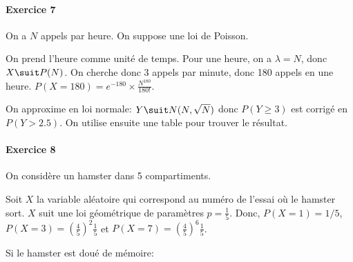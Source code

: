\documentclass[10pt,a4paper,french]{article}
\begin{document}
\paragraph{Exercice 7}
On a $N$ appels par heure. On suppose une loi de Poisson.

On prend l'heure comme unité de temps. Pour une heure, on a $\lambda = N$, donc $X \suit P(N)$. On cherche donc 3 appels par minute, donc 180 appels en une heure. $P(X=180)=e^{-180} \times \frac{N^{180}}{180!}$.

On approxime en loi normale: $Y \suit N(N, \sqrt{N})$ donc $P(Y \geq 3)$ est corrigé en $P(Y > 2.5)$. On utilise ensuite une table pour trouver le résultat.

\paragraph{Exercice 8}
On considère un hamster dans 5 compartiments.

Soit $X$ la variable aléatoire qui correspond au numéro de l'essai où le hamster sort. $X$ suit une loi géométrique de paramètres $p = \frac{1}{5}$. Donc, $P(X=1) = 1/5$, $P(X=3) = (\frac{4}{5})^2 \frac{1}{5}$ et $P(X=7) = (\frac{4}{5})^6 \frac{1}{5}$.

Si le hamster est doué de mémoire: 
\end{document}
